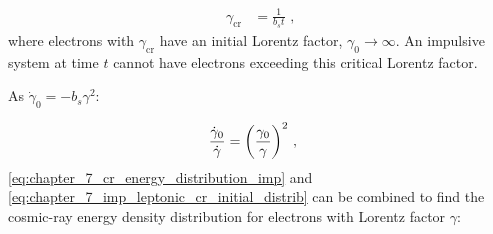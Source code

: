 \begin{equation}
    \begin{aligned}
    \gamma_\text{cr}&=\frac{1}{b_s t} \text{ ,}
    \end{aligned}\label{eq:chapter_7_imp_lep_critical_lorentz}
\end{equation}
\noindent where electrons with $\gamma_\text{cr}$ have an initial Lorentz factor, $\gamma_0\rightarrow \infty$. An impulsive system at time $t$ cannot have electrons exceeding this critical Lorentz factor.
\par
\noindent As $\dot{\gamma}_0=-b_s\gamma^2$:

\begin{equation}
	\begin{aligned}
		\frac{\dot{\gamma}_0}{\dot{\gamma}}&=\qty(\frac{\gamma_0}{\gamma})^2 \text{ ,}
	\end{aligned} \label{eq:chapter_7_gamma_gamma_0_ratio}
\end{equation}
\noindent \autoref{eq:chapter_7_cr_energy_distribution_imp} and \autoref{eq:chapter_7_imp_leptonic_cr_initial_distrib} can be combined to find the cosmic-ray energy density distribution for electrons with Lorentz factor $\gamma$:

